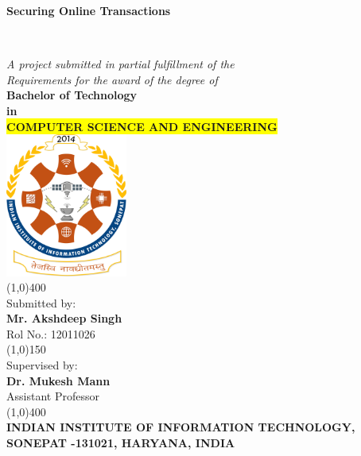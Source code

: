 \documentclass[12pt, oneside, a4paper]{article}
\begin{document}
\begin{center}
    \vspace{0.1cm}
    \begin{Large}\textbf{Securing Online Transactions}\end{Large}\\
    \vspace{1cm}\begin{large}
    \textit{A project submitted in partial fulfillment of the\\
    Requirements for the award of the degree of}\\
    \vspace{0.8cm}
    \textbf{Bachelor of Technology\\ in}\\
    \textbf{\colorbox{yellow}{COMPUTER SCIENCE AND ENGINEERING}}\\
    \vspace{0.6cm}
    \includegraphics[width=0.3\textwidth]{Clg_logo.png}\\
    \vspace{1cm}
    \line(1,0){400}\\\vspace{0.3cm}
    Submitted by:\\
    \textbf{Mr. Akshdeep Singh\\}Rol No.: 12011026\\
    \vspace{0.5cm}
    \line(1,0){150}\\
    \vspace{0.5cm}
    Supervised by:\\
    \textbf{Dr. Mukesh Mann}\\
    Assistant Professor\\
    \line(1,0){400}\\
    \vspace{2cm}
    \textbf{INDIAN INSTITUTE OF INFORMATION TECHNOLOGY,\\
    SONEPAT -131021, HARYANA, INDIA}\\\end{large}
\end{center}
\end{document}
